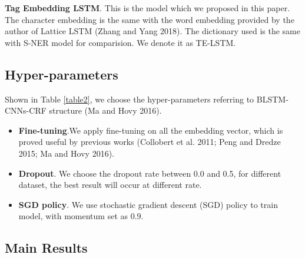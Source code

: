 \documentclass[letterpaper]{article} %
\begin{document}
\textbf{Tag Embedding LSTM}. This is the model which we proposed in this paper. The character embedding is the same with the word embedding provided by the author of Lattice LSTM (Zhang and Yang 2018). The dictionary used is the same with S-NER model for comparision. We denote it as TE-LSTM.

\subsection{Hyper-parameters}

Shown in Table \ref{table2}, we choose the hyper-parameters referring to BLSTM-CNNs-CRF structure (Ma and Hovy 2016). 

\begin{itemize}
\item \textbf{Fine-tuning}.We apply fine-tuning on all the embedding vector, which is proved useful by previous works (Collobert et al. 2011; Peng and Dredze 2015; Ma and Hovy 2016). 
\item \textbf{Dropout}. We choose the dropout rate between 0.0 and 0.5, for different dataset, the best result will occur at different rate.
\item \textbf{SGD policy}. We use stochastic gradient descent (SGD) policy to train model, with momentum set as 0.9.
\end{itemize}

\subsection{Main Results}

\begin{table}[t]
\caption{Main Results}\smallskip
\centering
{}
\label{table3}
\end{table}
\end{document}

